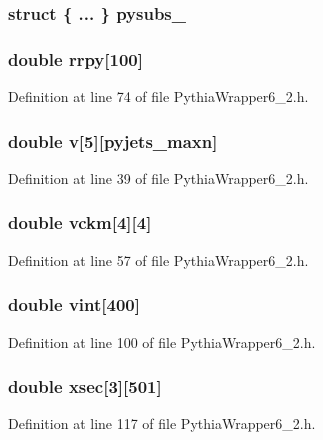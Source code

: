 \subsubsection{\setlength{\rightskip}{0pt plus 5cm}struct \{ ... \}   {\bf pysubs\_\-}}\label{PythiaWrapper6__2_8h_6d68201bde456b02a521c7905dd836c2}


\subsubsection{\setlength{\rightskip}{0pt plus 5cm}double {\bf rrpy}[100]}\label{PythiaWrapper6__2_8h_aae34e22a4763284acc84727170b8b1a}




Definition at line 74 of file Pythia\-Wrapper6\_\-2.h.
\subsubsection{\setlength{\rightskip}{0pt plus 5cm}double {\bf v}[5][{\bf pyjets\_\-maxn}]}\label{PythiaWrapper6__2_8h_da4ba0f82823c92769c798e51c8a1310}




Definition at line 39 of file Pythia\-Wrapper6\_\-2.h.
\subsubsection{\setlength{\rightskip}{0pt plus 5cm}double {\bf vckm}[4][4]}\label{PythiaWrapper6__2_8h_d3af0b3261dabd4faa1d7b65d12b8cbc}




Definition at line 57 of file Pythia\-Wrapper6\_\-2.h.
\subsubsection{\setlength{\rightskip}{0pt plus 5cm}double {\bf vint}[400]}\label{PythiaWrapper6__2_8h_b2af52c6eb9d154e3175fdac9c86682e}




Definition at line 100 of file Pythia\-Wrapper6\_\-2.h.
\subsubsection{\setlength{\rightskip}{0pt plus 5cm}double {\bf xsec}[3][501]}\label{PythiaWrapper6__2_8h_0258183160ed1cbf857bd1a02456e11a}




Definition at line 117 of file Pythia\-Wrapper6\_\-2.h.